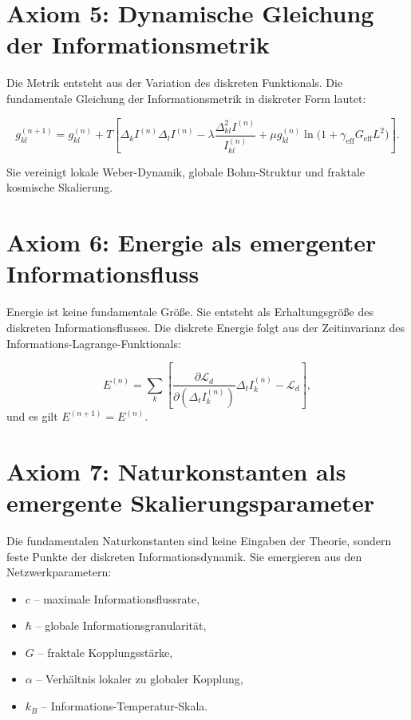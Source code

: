 \section{Axiom 5: Dynamische Gleichung der Informationsmetrik}
\label{sec:axiom5}

Die Metrik entsteht aus der Variation des diskreten Funktionals. Die fundamentale Gleichung der Informationsmetrik in diskreter Form lautet:

\[
g_{kl}^{(n+1)} = g_{kl}^{(n)} + T \left[ \Delta_k I^{(n)} \Delta_l I^{(n)} - \lambda \frac{\Delta_{kl}^2 I^{(n)}}{I_{kl}^{(n)}} + \mu g_{kl}^{(n)} \ln\!\bigl(1 + \gamma_{\text{eff}} G_{\text{eff}} L^2\bigr) \right].
\]

Sie vereinigt lokale Weber-Dynamik, globale Bohm-Struktur und fraktale kosmische Skalierung.

\section{Axiom 6: Energie als emergenter Informationsfluss}
\label{sec:axiom6}

Energie ist keine fundamentale Größe. Sie entsteht als Erhaltungsgröße des diskreten Informationsflusses. Die diskrete Energie folgt aus der Zeitinvarianz des Informations-Lagrange-Funktionals:

\[
E^{(n)} = \sum_k \left[ \frac{\partial \mathcal{L}_d}{\partial (\Delta_t I_k^{(n)})} \Delta_t I_k^{(n)} - \mathcal{L}_d \right],
\]
und es gilt \( E^{(n+1)} = E^{(n)} \).

\section{Axiom 7: Naturkonstanten als emergente Skalierungsparameter}
\label{sec:axiom7}

Die fundamentalen Naturkonstanten sind keine Eingaben der Theorie, sondern feste Punkte der diskreten Informationsdynamik. Sie emergieren aus den Netzwerkparametern:

\begin{itemize}
    \item \( c \) – maximale Informationsflussrate,
    \item \( \hbar \) – globale Informationsgranularität,
    \item \( G \) – fraktale Kopplungsstärke,
    \item \( \alpha \) – Verhältnis lokaler zu globaler Kopplung,
    \item \( k_B \) – Informations-Temperatur-Skala.
\end{itemize}

